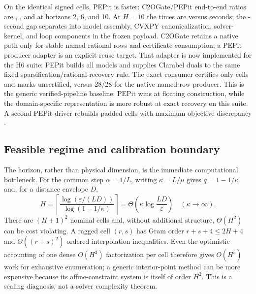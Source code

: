 \documentclass[smallextended]{svjour3}
\newcommand{\eps}{\varepsilon}
\begin{document}
On the identical signed cells, PEPit \PepitVersion{} is faster: C2OGate/PEPit
end-to-end ratios are \PepitHtwoEndToEndRatio{},
\PepitHsixEndToEndRatio{}, and \PepitHtenEndToEndRatio{} at horizons 2, 6,
and 10.  At $H=10$ the times are \CtwoHtenSerialWall{} versus
\PepitHtenSerialWall{} seconds; the \PepitHtenExtraWall{}-second gap separates
into model assembly, CVXPY canonicalization, solver-kernel, and loop components
in the frozen payload.  C2OGate retains a native path only for stable named
rational rows and certificate consumption; a PEPit producer adapter is an
explicit reuse target.  That adapter is now implemented for the H6 suite:
PEPit builds all \PepitVerifiedAttempted{} models and supplies Clarabel duals
to the same fixed sparsification/rational-recovery rule.  The exact consumer
certifies only \PepitVerifiedCells{} cells and marks
\PepitVerifiedUncertified{} uncertified, versus 28/28 for the native named-row
producer.  This is the generic verified-pipeline baseline: PEPit wins at
floating construction, while the domain-specific representation is more
robust at exact recovery on this suite.  A second PEPit driver rebuilds
\PaddedCrosscheckCells{} padded cells with maximum objective discrepancy
\PaddedCrosscheckMaxDifference{}.

\subsection{Feasible regime and calibration boundary}
\label{sec:feasible-regime}

The horizon, rather than physical dimension, is the immediate computational
bottleneck.  For the common step $\alpha=1/L$, writing
$\kappa=L/\mu$ gives $q=1-1/\kappa$ and, for a distance envelope $D$,
\begin{equation}
 H=\left\lceil
 \frac{\log(\eps/(LD))}{\log(1-1/\kappa)}
 \right\rceil
 =\Theta\!\left(\kappa\log\frac{LD}{\eps}\right)
 \quad(\kappa\to\infty).                              \label{eq:horizon-scaling}
\end{equation}
There are $(H+1)^2$ nominal cells and, without additional structure,
$\Theta(H^2)$ can be cost violating.  A ragged cell $(r,s)$ has Gram order
$r+s+4\leq2H+4$ and $\Theta((r+s)^2)$ ordered interpolation inequalities.
Even the optimistic accounting of one dense $O(H^3)$ factorization per cell
therefore gives $O(H^5)$ work for exhaustive enumeration; a generic
interior-point method can be more expensive because its affine-constraint
system is itself of order $H^2$.  This is a scaling diagnosis, not a solver
complexity theorem.
\end{document}
